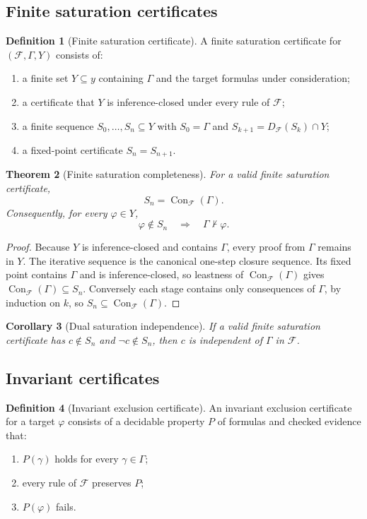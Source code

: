 \documentclass[11pt]{article}
\newtheorem{theorem}{Theorem}[section]
\newtheorem{corollary}[theorem]{Corollary}
\theoremstyle{definition}
\newtheorem{definition}[theorem]{Definition}
\theoremstyle{remark}
\newcommand{\Con}{\operatorname{Con}}
\newcommand{\F}{\mathcal F}
\newcommand{\Gammaa}{\Gamma}
\begin{document}
\subsection{Finite saturation certificates}
\begin{definition}[Finite saturation certificate]
A finite saturation certificate for $(\F,\Gammaa,Y)$ consists of:
\begin{enumerate}[label=(\roman*)]
  \item a finite set $Y\subseteq y$ containing $\Gammaa$ and the target formulas under consideration;
  \item a certificate that $Y$ is inference-closed under every rule of $\F$;
  \item a finite sequence $S_0,\ldots,S_n\subseteq Y$ with $S_0=\Gammaa$ and $S_{k+1}=D_{\F}(S_k)\cap Y$;
  \item a fixed-point certificate $S_n=S_{n+1}$.
\end{enumerate}
\end{definition}

\begin{theorem}[Finite saturation completeness]
For a valid finite saturation certificate,
\[
S_n=\Con_{\F}(\Gammaa).
\]
Consequently, for every $\varphi\in Y$,
\[
\varphi\notin S_n\quad\Longrightarrow\quad\Gammaa\nvdash\varphi.
\]
\end{theorem}

\begin{proof}
Because $Y$ is inference-closed and contains $\Gammaa$, every proof from $\Gammaa$ remains in $Y$. The iterative sequence is the canonical one-step closure sequence. Its fixed point contains $\Gammaa$ and is inference-closed, so leastness of $\Con_{\F}(\Gammaa)$ gives $\Con_{\F}(\Gammaa)\subseteq S_n$. Conversely each stage contains only consequences of $\Gammaa$, by induction on $k$, so $S_n\subseteq\Con_{\F}(\Gammaa)$.
\end{proof}

\begin{corollary}[Dual saturation independence]
If a valid finite saturation certificate has $c\notin S_n$ and $\neg c\notin S_n$, then $c$ is independent of $\Gammaa$ in $\F$.
\end{corollary}

\subsection{Invariant certificates}
\begin{definition}[Invariant exclusion certificate]
An invariant exclusion certificate for a target $\varphi$ consists of a decidable property $P$ of formulas and checked evidence that:
\begin{enumerate}[label=(\roman*)]
  \item $P(\gamma)$ holds for every $\gamma\in\Gammaa$;
  \item every rule of $\F$ preserves $P$;
  \item $P(\varphi)$ fails.
\end{enumerate}
\end{definition}
\end{document}
